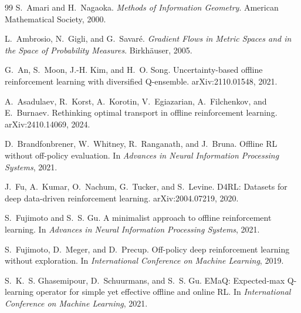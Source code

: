 \begin{thebibliography}{99}
S.~Amari and H.~Nagaoka.
\newblock \emph{Methods of Information Geometry}.
\newblock American Mathematical Society, 2000.

L.~Ambrosio, N.~Gigli, and G.~Savar\'e.
\newblock \emph{Gradient Flows in Metric Spaces and in the Space of Probability Measures}.
\newblock Birkh\"auser, 2005.

G.~An, S.~Moon, J.-H. Kim, and H.~O. Song.
\newblock Uncertainty-based offline reinforcement learning with diversified Q-ensemble.
\newblock arXiv:2110.01548, 2021.

A.~Asadulaev, R.~Korst, A.~Korotin, V.~Egiazarian, A.~Filchenkov, and E.~Burnaev.
\newblock Rethinking optimal transport in offline reinforcement learning.
\newblock arXiv:2410.14069, 2024.

D.~Brandfonbrener, W.~Whitney, R.~Ranganath, and J.~Bruna.
\newblock Offline RL without off-policy evaluation.
\newblock In \emph{Advances in Neural Information Processing Systems}, 2021.

J.~Fu, A.~Kumar, O.~Nachum, G.~Tucker, and S.~Levine.
\newblock D4RL: Datasets for deep data-driven reinforcement learning.
\newblock arXiv:2004.07219, 2020.

S.~Fujimoto and S.~S. Gu.
\newblock A minimalist approach to offline reinforcement learning.
\newblock In \emph{Advances in Neural Information Processing Systems}, 2021.

S.~Fujimoto, D.~Meger, and D.~Precup.
\newblock Off-policy deep reinforcement learning without exploration.
\newblock In \emph{International Conference on Machine Learning}, 2019.

S.~K.~S. Ghasemipour, D.~Schuurmans, and S.~S. Gu.
\newblock EMaQ: Expected-max Q-learning operator for simple yet effective offline and online RL.
\newblock In \emph{International Conference on Machine Learning}, 2021.


\end{thebibliography}
